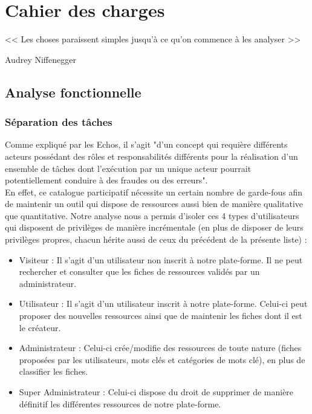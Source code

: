 \chapter{Cahier des charges}

\epigraph{<< Les choses paraissent simples jusqu'à ce qu'on commence à les analyser >>}{Audrey Niffenegger}

\section{Analyse fonctionnelle}

\subsection*{Séparation des tâches}

Comme expliqué par les Echos\cite{SOD}, il s'agit  "d'un concept qui requière différents acteurs possédant des rôles et responsabilités différents pour la réalisation d’un ensemble de tâches dont l’exécution par un unique acteur pourrait potentiellement conduire à des fraudes ou des erreurs". \\


En effet, ce catalogue participatif nécessite un certain nombre de garde-fous afin de maintenir un outil qui dispose de ressources aussi bien de manière qualitative que quantitative. Notre analyse nous a permis d'isoler ces 4 types d'utilisateurs qui disposent de privilèges de manière incrémentale (en plus de disposer de leurs privilèges propres, chacun hérite aussi de ceux du précédent de la présente liste) :


\begin{itemize}
    \item Visiteur : Il s'agit d'un utilisateur non inscrit à notre plate-forme. Il ne peut rechercher et consulter que les fiches de ressources validés par un administrateur.
    \item Utilisateur : Il s'agit d'un utilisateur  inscrit à notre plate-forme. Celui-ci peut proposer des nouvelles ressources ainsi que de maintenir les fiches dont il est le créateur.
    \item Administrateur : Celui-ci crée/modifie des ressources de toute nature (fiches proposées par les utilisateurs, mots clés et catégories de mots clé), en plus de classifier les fiches.
    \item Super Administrateur : Celui-ci dispose du droit de supprimer de manière définitif les différentes ressources de notre plate-forme.
\end{itemize}

